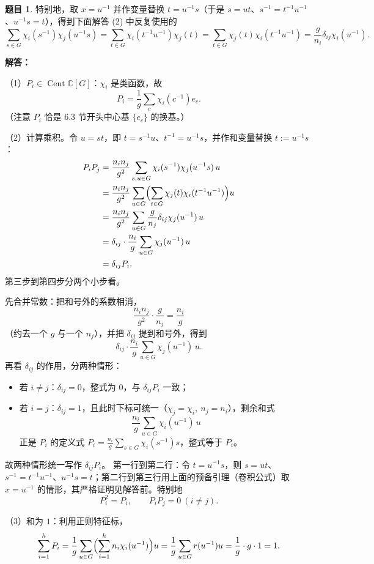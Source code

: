 \documentclass[a4paper]{ctexart}
\theoremstyle{definition}
\newtheorem{example}{题目}[section]
\theoremstyle{analysis}
\theoremstyle{plain}
\begin{document}
\begin{example}
特别地，取 \(x=u^{-1}\) 并作变量替换 \(t=u^{-1}s\)（于是 \(s=ut\)、\(s^{-1}=t^{-1}u^{-1}\)、\(u^{-1}s=t\)），得到下面解答 (2) 中反复使用的
\[
  \sum_{s\in G}\chi_i(s^{-1})\chi_j(u^{-1}s)
  =\sum_{t\in G}\chi_i(t^{-1}u^{-1})\chi_j(t)
  =\sum_{t\in G}\chi_j(t)\chi_i(t^{-1}u^{-1})
  =\frac{g}{n_i}\delta_{ij}\chi_i(u^{-1}).
\]

\textbf{解答：}

（1）\(P_i\in\operatorname{Cent}\mathbb C[G]\)：\(\chi_i\) 是类函数，故
\[
  P_i=\frac{1}{g}\sum_{c}\chi_i(c^{-1})e_c.
\]
（注意 \(P_i\) 恰是 6.3 节开头中心基 \(\{e_c\}\) 的换基。）

（2）计算乘积。令 \(u=st\)，即 \(t=s^{-1}u\)、\(t^{-1}=u^{-1}s\)，并作和变量替换 \(t:=u^{-1}s\)：
\[
  \begin{aligned}
    P_iP_j
    &=\frac{n_in_j}{g^2}\sum_{s,u\in G}\chi_i(s^{-1})\chi_j(u^{-1}s)\,u\\
    &=\frac{n_in_j}{g^2}\sum_{u\in G}\Bigl(\sum_{t\in G}\chi_j(t)\chi_i(t^{-1}u^{-1})\Bigr)u\\
    &=\frac{n_in_j}{g^2}\sum_{u\in G}\frac{g}{n_j}\delta_{ij}\chi_j(u^{-1})\,u\\
    &=\delta_{ij}\cdot\frac{n_i}{g}\sum_{u\in G}\chi_j(u^{-1})\,u\\
    &=\delta_{ij}P_i.
  \end{aligned}
\]
第三步到第四步分两个小步看。

先合并常数：把和号外的系数相消，
\[
  \frac{n_in_j}{g^2}\cdot\frac{g}{n_j}=\frac{n_i}{g}
\]
（约去一个 \(g\) 与一个 \(n_j\)），并把 \(\delta_{ij}\) 提到和号外，得到
\[
  \delta_{ij}\cdot\frac{n_i}{g}\sum_{u\in G}\chi_j(u^{-1})\,u.
\]
再看 \(\delta_{ij}\) 的作用，分两种情形：
\begin{itemize}
  \item 若 \(i\neq j\)：\(\delta_{ij}=0\)，整式为 \(0\)，与 \(\delta_{ij}P_i\) 一致；
  \item 若 \(i=j\)：\(\delta_{ij}=1\)，且此时下标可统一（\(\chi_j=\chi_i,\ n_j=n_i\)），剩余和式
  \[
    \frac{n_i}{g}\sum_{u\in G}\chi_i(u^{-1})\,u
  \]
  正是 \(P_i\) 的定义式 \(\displaystyle P_i=\frac{n_i}{g}\sum_{s\in G}\chi_i(s^{-1})s\)，整式等于 \(P_i\)。
\end{itemize}
故两种情形统一写作 \(\delta_{ij}P_i\)。
第一行到第二行：令 \(t=u^{-1}s\)，则 \(s=ut\)、\(s^{-1}=t^{-1}u^{-1}\)、\(u^{-1}s=t\)；第二行到第三行用上面的预备引理（卷积公式）取 \(x=u^{-1}\) 的情形，其严格证明见解答前。特别地
\[
  P_i^2=P_i,\qquad P_iP_j=0\ (i\neq j).
\]

（3）和为 \(1\)：利用正则特征标，
\[
  \sum_{i=1}^h P_i
  =\frac{1}{g}\sum_{u\in G}\Bigl(\sum_{i=1}^h n_i\chi_i(u^{-1})\Bigr)u
  =\frac{1}{g}\sum_{u\in G}r(u^{-1})u
  =\frac{1}{g}\cdot g\cdot 1=1.
\]


\end{example}
\end{document}
